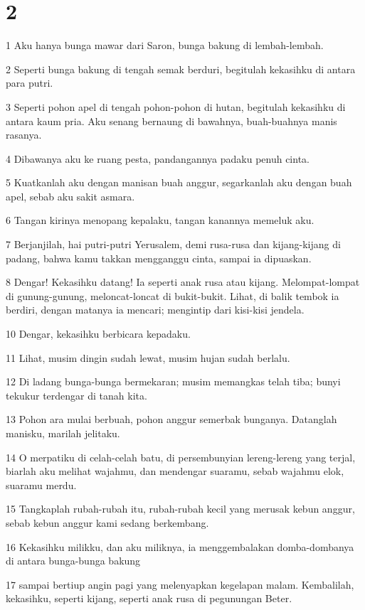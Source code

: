\chapter{2}

\par 1 Aku hanya bunga mawar dari Saron, bunga bakung di lembah-lembah.
\par 2 Seperti bunga bakung di tengah semak berduri, begitulah kekasihku di antara para putri.
\par 3 Seperti pohon apel di tengah pohon-pohon di hutan, begitulah kekasihku di antara kaum pria. Aku senang bernaung di bawahnya, buah-buahnya manis rasanya.
\par 4 Dibawanya aku ke ruang pesta, pandangannya padaku penuh cinta.
\par 5 Kuatkanlah aku dengan manisan buah anggur, segarkanlah aku dengan buah apel, sebab aku sakit asmara.
\par 6 Tangan kirinya menopang kepalaku, tangan kanannya memeluk aku.
\par 7 Berjanjilah, hai putri-putri Yerusalem, demi rusa-rusa dan kijang-kijang di padang, bahwa kamu takkan mengganggu cinta, sampai ia dipuaskan.
\par 8 Dengar! Kekasihku datang! Ia seperti anak rusa atau kijang. Melompat-lompat di gunung-gunung, meloncat-loncat di bukit-bukit. Lihat, di balik tembok ia berdiri, dengan matanya ia mencari; mengintip dari kisi-kisi jendela.
\par 10 Dengar, kekasihku berbicara kepadaku.
\par 11 Lihat, musim dingin sudah lewat, musim hujan sudah berlalu.
\par 12 Di ladang bunga-bunga bermekaran; musim memangkas telah tiba; bunyi tekukur terdengar di tanah kita.
\par 13 Pohon ara mulai berbuah, pohon anggur semerbak bunganya. Datanglah manisku, marilah jelitaku.
\par 14 O merpatiku di celah-celah batu, di persembunyian lereng-lereng yang terjal, biarlah aku melihat wajahmu, dan mendengar suaramu, sebab wajahmu elok, suaramu merdu.
\par 15 Tangkaplah rubah-rubah itu, rubah-rubah kecil yang merusak kebun anggur, sebab kebun anggur kami sedang berkembang.
\par 16 Kekasihku milikku, dan aku miliknya, ia menggembalakan domba-dombanya di antara bunga-bunga bakung
\par 17 sampai bertiup angin pagi yang melenyapkan kegelapan malam. Kembalilah, kekasihku, seperti kijang, seperti anak rusa di pegunungan Beter.

